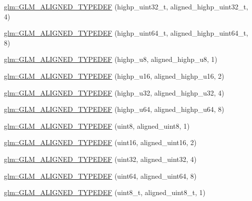 \begin{DoxyCompactItemize}
\item 
\hyperlink{group__gtx__type__aligned_ga329f1e2b94b33ba5e3918197030bcf03}{glm\-::\-G\-L\-M\-\_\-\-A\-L\-I\-G\-N\-E\-D\-\_\-\-T\-Y\-P\-E\-D\-E\-F} (highp\-\_\-uint32\-\_\-t, aligned\-\_\-highp\-\_\-uint32\-\_\-t, 4)
\item 
\hyperlink{group__gtx__type__aligned_ga71e646f7e301aa422328194162c9c998}{glm\-::\-G\-L\-M\-\_\-\-A\-L\-I\-G\-N\-E\-D\-\_\-\-T\-Y\-P\-E\-D\-E\-F} (highp\-\_\-uint64\-\_\-t, aligned\-\_\-highp\-\_\-uint64\-\_\-t, 8)
\item 
\hyperlink{group__gtx__type__aligned_ga8942e09f479489441a7a5004c6d8cb66}{glm\-::\-G\-L\-M\-\_\-\-A\-L\-I\-G\-N\-E\-D\-\_\-\-T\-Y\-P\-E\-D\-E\-F} (highp\-\_\-u8, aligned\-\_\-highp\-\_\-u8, 1)
\item 
\hyperlink{group__gtx__type__aligned_gaab32497d6e4db16ee439dbedd64c5865}{glm\-::\-G\-L\-M\-\_\-\-A\-L\-I\-G\-N\-E\-D\-\_\-\-T\-Y\-P\-E\-D\-E\-F} (highp\-\_\-u16, aligned\-\_\-highp\-\_\-u16, 2)
\item 
\hyperlink{group__gtx__type__aligned_gaaadbb34952eca8e3d7fe122c3e167742}{glm\-::\-G\-L\-M\-\_\-\-A\-L\-I\-G\-N\-E\-D\-\_\-\-T\-Y\-P\-E\-D\-E\-F} (highp\-\_\-u32, aligned\-\_\-highp\-\_\-u32, 4)
\item 
\hyperlink{group__gtx__type__aligned_ga92024d27c74a3650afb55ec8e024ed25}{glm\-::\-G\-L\-M\-\_\-\-A\-L\-I\-G\-N\-E\-D\-\_\-\-T\-Y\-P\-E\-D\-E\-F} (highp\-\_\-u64, aligned\-\_\-highp\-\_\-u64, 8)
\item 
\hyperlink{group__gtx__type__aligned_gabde1d0b4072df35453db76075ab896a6}{glm\-::\-G\-L\-M\-\_\-\-A\-L\-I\-G\-N\-E\-D\-\_\-\-T\-Y\-P\-E\-D\-E\-F} (uint8, aligned\-\_\-uint8, 1)
\item 
\hyperlink{group__gtx__type__aligned_ga06c296c9e398b294c8c9dd2a7693dcbb}{glm\-::\-G\-L\-M\-\_\-\-A\-L\-I\-G\-N\-E\-D\-\_\-\-T\-Y\-P\-E\-D\-E\-F} (uint16, aligned\-\_\-uint16, 2)
\item 
\hyperlink{group__gtx__type__aligned_gacf1744488c96ebd33c9f36ad33b2010a}{glm\-::\-G\-L\-M\-\_\-\-A\-L\-I\-G\-N\-E\-D\-\_\-\-T\-Y\-P\-E\-D\-E\-F} (uint32, aligned\-\_\-uint32, 4)
\item 
\hyperlink{group__gtx__type__aligned_ga3328061a64c20ba59d5f9da24c2cd059}{glm\-::\-G\-L\-M\-\_\-\-A\-L\-I\-G\-N\-E\-D\-\_\-\-T\-Y\-P\-E\-D\-E\-F} (uint64, aligned\-\_\-uint64, 8)
\item 
\hyperlink{group__gtx__type__aligned_gaf6ced36f13bae57f377bafa6f5fcc299}{glm\-::\-G\-L\-M\-\_\-\-A\-L\-I\-G\-N\-E\-D\-\_\-\-T\-Y\-P\-E\-D\-E\-F} (uint8\-\_\-t, aligned\-\_\-uint8\-\_\-t, 1)

\end{DoxyCompactItemize}
